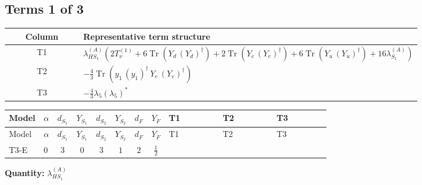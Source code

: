 \documentclass[8pt]{article}
\begin{document}
\begin{landscape}
\subsection*{Terms 1 of 3}
\begin{center}
\begin{tabular}{@{}c >{\raggedright\arraybackslash}p{0.82\linewidth}@{}}
\toprule
Column & Representative term structure \\
\midrule
T1 & \(\displaystyle {\lambda_{HS_1}^{(A)}} (2 T_{\nu}^{(1)}+6 \operatorname{Tr}\!\left({Y_d}\,\left({Y_d}\right)^{\dagger}\right)+2 \operatorname{Tr}\!\left({Y_e}\,\left({Y_e}\right)^{\dagger}\right)+6 \operatorname{Tr}\!\left({Y_u}\,\left({Y_u}\right)^{\dagger}\right)+16 {\lambda_{S_1}^{(A)}})\) \\
\midrule
T2 & \(\displaystyle -\frac{4}{3} \operatorname{Tr}\!\left({y_1}\,\left({y_1}\right)^{\dagger}\,{Y_e}\,\left({Y_e}\right)^{\dagger}\right)\) \\
\midrule
T3 & \(\displaystyle -\frac{4}{3} {\lambda_5} \left({\lambda_5}\right)^{*}\) \\
\midrule
\bottomrule
\end{tabular}
\end{center}
\smallskip
\tiny
\begin{longtable}{@{}llcccccc >{\raggedright\arraybackslash}p{0.21\linewidth} >{\raggedright\arraybackslash}p{0.21\linewidth} >{\raggedright\arraybackslash}p{0.21\linewidth}@{}}
\toprule
Model & $\alpha$ & $d_{S_1}$ & $Y_{S_1}$ & $d_{S_2}$ & $Y_{S_2}$ & $d_F$ & $Y_F$ & T1 & T2 & T3 \\
\midrule
\endfirsthead
\toprule
Model & $\alpha$ & $d_{S_1}$ & $Y_{S_1}$ & $d_{S_2}$ & $Y_{S_2}$ & $d_F$ & $Y_F$ & T1 & T2 & T3 \\
\midrule
\endhead
T3-E & $0$ & $3$ & $0$ & $3$ & $1$ & $2$ & $\frac{1}{2}$ & \scriptsize\adjustbox{max width=\linewidth}{$\begin{gathered} {\lambda_{HS_1}^{(A)}} (2 T_{\nu}^{(1)}+6 \operatorname{Tr}\!\left({Y_d}\,\left({Y_d}\right)^{\dagger}\right)+2 \operatorname{Tr}\!\left({Y_e}\,\left({Y_e}\right)^{\dagger}\right)+6 \operatorname{Tr}\!\left({Y_u}\,\left({Y_u}\right)^{\dagger}\right)+16 {\lambda_{S_1}^{(A)}})\end{gathered}$} & \scriptsize\adjustbox{max width=\linewidth}{$\begin{gathered} -\frac{4}{3} \operatorname{Tr}\!\left({y_1}\,\left({y_1}\right)^{\dagger}\,{Y_e}\,\left({Y_e}\right)^{\dagger}\right)\end{gathered}$} & \scriptsize\adjustbox{max width=\linewidth}{$\begin{gathered} -\frac{4}{3} {\lambda_5} \left({\lambda_5}\right)^{*}\end{gathered}$} \\
\midrule
\bottomrule
\end{longtable}
\clearpage
\noindent\textbf{Quantity: }$\lambda_{HS_1}^{(A)}$\par\smallskip

\end{landscape}
\end{document}
